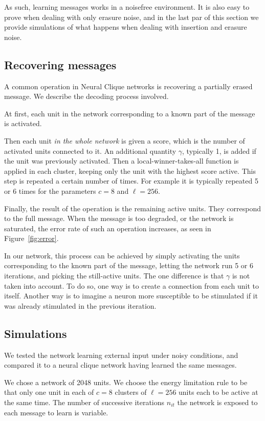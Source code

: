 \documentclass[journal]{IEEEtran}
\begin{document}
As such, learning messages works in a noisefree environment. It is also easy to prove when dealing with only erasure noise, and in the last par of this section we provide simulations of what happens when dealing with insertion and erasure noise.

\subsection{Recovering messages}

A common operation in Neural Clique networks is recovering a partially erased message. We describe the decoding process involved.

At first, each unit in the network corresponding to a known part of the message is activated. 

Then each unit \emph{in the whole network} is given a score, which is the number of activated units connected to it. An additional quantity $\gamma$, typically 1, is added if the unit was previously activated. Then a local-winner-takes-all function is applied in each cluster, keeping only the unit with the highest score active. This step is repeated a certain number of times. For example it is typically repeated 5 or 6 times for the parameters $c=8$ and $\ell=256$.

Finally, the result of the operation is the remaining active units. They correspond to the full message. When the message is too degraded, or the network is saturated, the error rate of such an operation increases, as seen in Figure~\ref{fig:error}.

In our network, this process can be achieved by simply activating the units corresponding to the known part of the message, letting the network run 5 or 6 iterations, and picking the still-active units. The one difference is that $\gamma$ is not taken into account. To do so, one way is to create a connection from each unit to itself. Another way is to imagine a neuron more susceptible to be stimulated if it was already stimulated in the previous iteration.

\subsection{Simulations}

We tested the network learning external input under noisy conditions, and compared it to a neural clique network having learned the same messages.

We chose a network of 2048 units. We choose the energy limitation rule to be that only one unit in each of $c=8$ clusters of $\ell=256$ units each to be active at the same time. The number of successive iterations $n_{it}$ the network is exposed to each message to learn is variable. 
\end{document}
